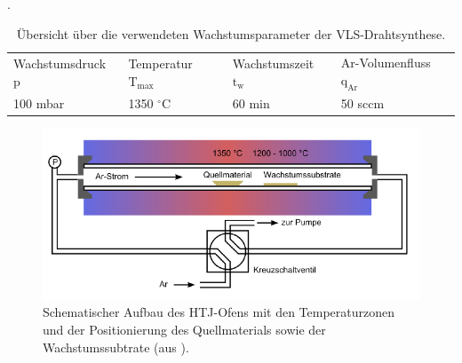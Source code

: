 \cite{Geburt.Diss}. \begin{table} \begin{tabular}{llll} Wachstumsdruck p &
Temperatur $\text{T}_\text{max}$ & Wachstumszeit $\text{t}_\text{w}$ &
Ar-Volumenfluss $\text{q}_\text{Ar}$ \\ 100 mbar & 1350 $^{\circ}$C & 60 min &
50 sccm \\ \end{tabular} \caption[VLS-Wachstumsparameter]{Übersicht über die
verwendeten Wachstumsparameter der VLS-Drahtsynthese.} \label{Params}
\end{table} \begin{figure} \centering
\includegraphics[width=.75\textwidth]{Bilder/Methodik/htj}
\caption[Schematischer Aufbau des HTJ-Ofens]{Schematischer Aufbau des HTJ-Ofens
mit den Temperaturzonen und der Positionierung des Quellmaterials sowie der
Wachstumssubtrate (aus \cite{Thielmann.Dipl}).} \label{htj} \end{figure}
